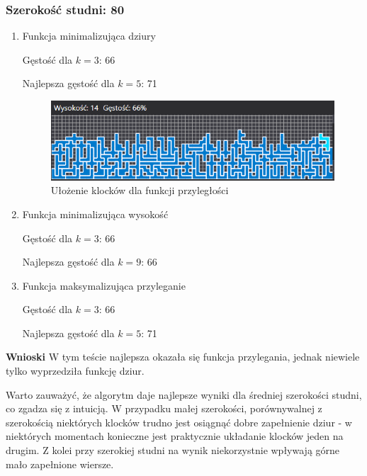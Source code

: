 \documentclass{article}
\begin{document}
\subsubsection{Szerokość studni: 80}
\begin{enumerate}

\item Funkcja minimalizująca dziury

Gęstość dla $k=3$: 66

Najlepsza gęstość dla $k=5$: 71

\begin{figure}[H]
\includegraphics[width=\textwidth]{szeroka_plansza.PNG}
\caption{Ułożenie klocków dla funkcji przyległości}
\end{figure}

\item Funkcja minimalizująca wysokość

Gęstość dla $k=3$: 66

Najlepsza gęstość dla $k=9$: 66

\item Funkcja maksymalizująca przyleganie

Gęstość dla $k=3$: 66

Najlepsza gęstość dla $k=5$: 71

\end{enumerate}
\textbf{Wnioski}
W tym teście najlepsza okazała się funkcja przylegania, jednak niewiele tylko wyprzedziła funkcję dziur.

Warto zauważyć, że algorytm daje najlepsze wyniki dla średniej szerokości studni, co zgadza się z intuicją.
W przypadku małej szerokości, porównywalnej z szerokością niektórych klocków trudno jest osiągnąć dobre zapełnienie dziur - w niektórych momentach konieczne jest praktycznie układanie klocków jeden na drugim.
Z kolei przy szerokiej studni na wynik niekorzystnie wpływają górne mało zapełnione wiersze.
\end{document}
